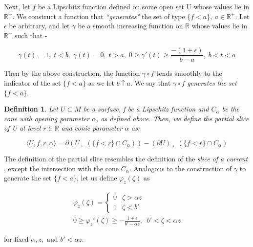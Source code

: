 \documentclass{amsart}
\newtheorem{definition}{Definition}
\theoremstyle{named}
\begin{document}
Next, let $f$ be a Lipschitz function defined on some open set U whose values lie in $\mathbb{R}^{+}$. We construct a function that \textit{``generates"} the set of type $\{f < a\}, \: a \in \mathbb{R}^{+}$. Let $\epsilon$ be arbitrary, and let $\gamma$ be a smooth increasing function on $\mathbb{R}$ whose values lie in $\mathbb{R}^{+}$ such that - 

\begin{equation}
    \gamma(t) = 1, \; t < b, \; \gamma(t) = 0, \; t > a, \; 0 \geq \gamma'(t) \geq \frac{-(1 + \epsilon)}{b - a}, \;  b < t < a 
\end{equation}

Then by the above construction, the function $\gamma \circ f$ tends smoothly to the indicator of the set $\{ f < a\}$ as we let $b \uparrow a$. We say that $\gamma \circ f$ \textit{generates the set} $\{f < a\}$. \\


\begin{definition}
    Let $U \subset M$ be a surface, f be a Lipschitz function and $C_{\alpha}$ be the cone with opening parameter $\alpha$, as defined above. Then, we define the \textit{partial slice of U at level $r \in \mathbb{R}$ and conic parameter $\alpha$} as:

    \begin{equation} \nonumber
        \langle U,f,r,\alpha \rangle = \partial(U \llcorner (\{ f < r \} \cap C_{\alpha})) - (\partial U) \llcorner (\{f < r \} \cap C_{\alpha})
    \end{equation}
\end{definition}

The definition of the partial slice resembles the definition of the \textit{slice of a current} \cite{simon}, except the intersection with the cone $C_{\alpha}$. Analogous to the construction of $\gamma$ to generate the set $\{ f < a \}$, let us define $\varphi_z (\zeta)$ as 

    \begin{eqnarray} \nonumber
        \varphi_z (\zeta) = \begin{cases}
            0 & \zeta > \alpha z \\
            1 & \zeta < b'
        \end{cases} \\ \nonumber
        0 \geq \varphi_z ' (\zeta) \geq -\frac{1+\epsilon}{b' - \alpha z}, \;\; b' < \zeta < \alpha z 
    \end{eqnarray}
    
    for fixed $\alpha, z, \text{ and } b' < \alpha z$. \\
    
\end{document}
